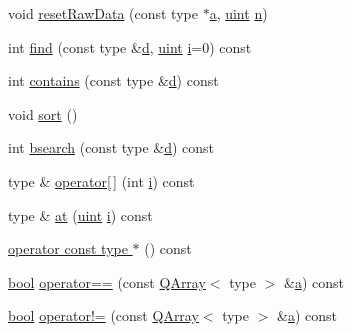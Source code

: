 \begin{DoxyCompactItemize}
\item 
void \hyperlink{class_q_array_a7bdf2011fa958db2fe21c50e202125c3}{reset\+Raw\+Data} (const type $\ast$\hyperlink{060__command__switch_8tcl_ab08ae027fc5777bc4f0629f1b60b35db}{a}, \hyperlink{qglobal_8h_a4d3943ddea65db7163a58e6c7e8df95a}{uint} \hyperlink{060__command__switch_8tcl_acdde3cd86eb2421ce8dbb2e85227d368}{n})
\item 
int \hyperlink{class_q_array_a40843691de23e8129ebefa8449b5ac23}{find} (const type \&\hyperlink{060__command__switch_8tcl_af43f4b1f0064a33b2d662af9f06d3a00}{d}, \hyperlink{qglobal_8h_a4d3943ddea65db7163a58e6c7e8df95a}{uint} \hyperlink{060__command__switch_8tcl_a8c90afd4641b25be86bd09983c3cbee0}{i}=0) const 
\item 
int \hyperlink{class_q_array_afabfa2208aae032f26420d051e329a06}{contains} (const type \&\hyperlink{060__command__switch_8tcl_af43f4b1f0064a33b2d662af9f06d3a00}{d}) const 
\item 
void \hyperlink{class_q_array_a2213d4e7a1bd5d601f3d27b40afa518b}{sort} ()
\item 
int \hyperlink{class_q_array_a748bd7de9439670079eba255d68936cc}{bsearch} (const type \&\hyperlink{060__command__switch_8tcl_af43f4b1f0064a33b2d662af9f06d3a00}{d}) const 
\item 
type \& \hyperlink{class_q_array_a6e4f0c568c4a51a750cf86b43de5e821}{operator\mbox{[}$\,$\mbox{]}} (int \hyperlink{060__command__switch_8tcl_a8c90afd4641b25be86bd09983c3cbee0}{i}) const 
\item 
type \& \hyperlink{class_q_array_ac9e59af15a1842cc64d2498443614a09}{at} (\hyperlink{qglobal_8h_a4d3943ddea65db7163a58e6c7e8df95a}{uint} \hyperlink{060__command__switch_8tcl_a8c90afd4641b25be86bd09983c3cbee0}{i}) const 
\item 
\hyperlink{class_q_array_a0c9208e91357f74c7fbf2e526dc860ff}{operator const type $\ast$} () const 
\item 
\hyperlink{qglobal_8h_a1062901a7428fdd9c7f180f5e01ea056}{bool} \hyperlink{class_q_array_a507054a761eab249002adae9456339fc}{operator==} (const \hyperlink{class_q_array}{Q\+Array}$<$ type $>$ \&\hyperlink{060__command__switch_8tcl_ab08ae027fc5777bc4f0629f1b60b35db}{a}) const 
\item 
\hyperlink{qglobal_8h_a1062901a7428fdd9c7f180f5e01ea056}{bool} \hyperlink{class_q_array_a8df64f35fcd0e55900a140619db218cc}{operator!=} (const \hyperlink{class_q_array}{Q\+Array}$<$ type $>$ \&\hyperlink{060__command__switch_8tcl_ab08ae027fc5777bc4f0629f1b60b35db}{a}) const 
\item 

\end{DoxyCompactItemize}

